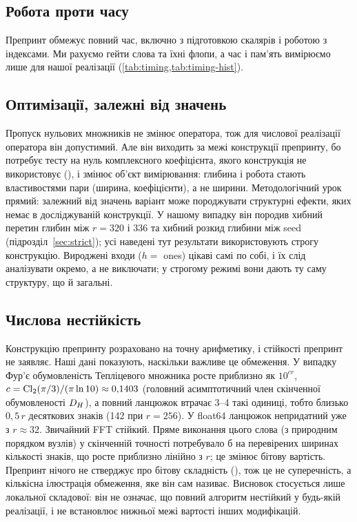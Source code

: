 \documentclass[11pt]{article}
\theoremstyle{plain}
\begin{document}
\subsection{Робота проти часу}
Препринт обмежує повний час, включно з підготовкою скалярів і роботою з індексами. Ми рахуємо гейти слова та їхні флопи, а час і пам'ять вимірюємо лише для нашої реалізації (\cref{tab:timing,tab:timing-hist}).

\subsection{Оптимізації, залежні від значень}\label{sec:disc-value}
Пропуск нульових множників не змінює оператора, тож для числової реалізації оператора він допустимий. Але він виходить за межі конструкції препринту, бо потребує тесту на нуль комплексного коефіцієнта, якого конструкція не використовує (), і змінює об'єкт вимірювання: глибина і робота стають властивостями пари (ширина, коефіцієнти), а не ширини. Методологічний урок прямий: залежний від значень варіант може породжувати структурні ефекти, яких немає в досліджуваній конструкції. У нашому випадку він породив хибний перетин глибин між $r=320$ і $336$ та хибний розкид глибини між seed (підрозділ~\ref{sec:strict}); усі наведені тут результати використовують строгу конструкцію. Вироджені входи ($h=$ ones) цікаві самі по собі, і їх слід аналізувати окремо, а не виключати; у строгому режимі вони дають ту саму структуру, що й загальні.

\subsection{Числова нестійкість}\label{sec:disc-instability}
Конструкцію препринту розраховано на точну арифметику, і стійкості препринт не заявляє. Наші дані показують, наскільки важливе це обмеження. У випадку Фур'є обумовленість Тепліцевого множника росте приблизно як $10^{cr}$, $c=\operatorname{Cl}_2(\pi/3)/(\pi\ln10)\approx0{,}1403$ (головний асимптотичний член скінченної обумовленості $D_H$), а повний ланцюжок втрачає 3--4 такі одиниці, тобто близько $0{,}5\,r$ десяткових знаків (142 при $r=256$). У float64 ланцюжок непридатний уже з $r\approx32$. Звичайний FFT стійкий. Пряме виконання цього слова (з природним порядком вузлів) у скінченній точності потребувало б на перевірених ширинах кількості знаків, що росте приблизно лінійно з $r$; це змінює бітову вартість. Препринт нічого не стверджує про бітову складність (), тож це не суперечність, а кількісна ілюстрація обмеження, яке він сам називає. Висновок стосується лише локальної складової: він не означає, що повний алгоритм нестійкий у будь-якій реалізації, і не встановлює нижньої межі вартості інших модифікацій.
\end{document}
